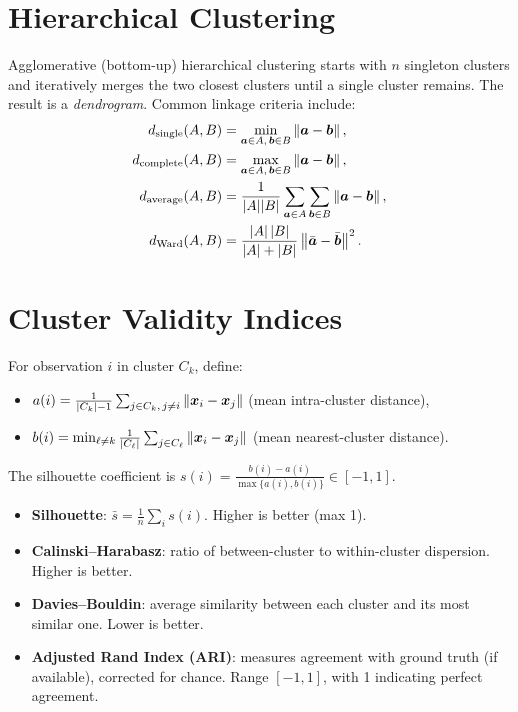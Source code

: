 \section{Hierarchical Clustering}

\begin{definition}
Agglomerative (bottom-up) hierarchical clustering starts with $n$ singleton clusters and iteratively merges the two closest clusters until a single cluster remains. The result is a \emph{dendrogram}. Common linkage criteria include:
\begin{align}
  d_{\text{single}}(A,B) &= \min_{\bm{a}\in A,\,\bm{b}\in B}\left\| \bm{a}-\bm{b} \right\|, \\
  d_{\text{complete}}(A,B) &= \max_{\bm{a}\in A,\,\bm{b}\in B}\left\| \bm{a}-\bm{b} \right\|, \\
  d_{\text{average}}(A,B) &= \frac{1}{|A||B|}\sum_{\bm{a}\in A}\sum_{\bm{b}\in B}\left\| \bm{a}-\bm{b} \right\|, \\
  d_{\text{Ward}}(A,B) &= \frac{|A|\,|B|}{|A|+|B|}\left\| \bar{\bm{a}}-\bar{\bm{b}} \right\|^2.
\end{align}
\end{definition}

\section{Cluster Validity Indices}

\begin{definition}
For observation $i$ in cluster $C_k$, define:
\begin{itemize}
  \item $a(i) = \frac{1}{|C_k|-1}\sum_{j\in C_k,\,j\neq i}\left\| \bm{x}_i - \bm{x}_j \right\|$ \quad (mean intra-cluster distance),
  \item $b(i) = \min_{\ell\neq k}\frac{1}{|C_\ell|}\sum_{j\in C_\ell}\left\| \bm{x}_i - \bm{x}_j \right\|$ \quad (mean nearest-cluster distance).
\end{itemize}
The silhouette coefficient is $s(i) = \frac{b(i)-a(i)}{\max\{a(i),b(i)\}}\in[-1,1]$.
\end{definition}

\begin{keyformulas}[title=\textbf{Cluster Validity Indices}]
\begin{itemize}
  \item \textbf{Silhouette}: $\bar s = \frac{1}{n}\sum_i s(i)$. Higher is better (max 1).
  \item \textbf{Calinski--Harabasz}: ratio of between-cluster to within-cluster dispersion. Higher is better.
  \item \textbf{Davies--Bouldin}: average similarity between each cluster and its most similar one. Lower is better.
  \item \textbf{Adjusted Rand Index (ARI)}: measures agreement with ground truth (if available), corrected for chance. Range $[-1,1]$, with 1 indicating perfect agreement.
\end{itemize}
\end{keyformulas}

